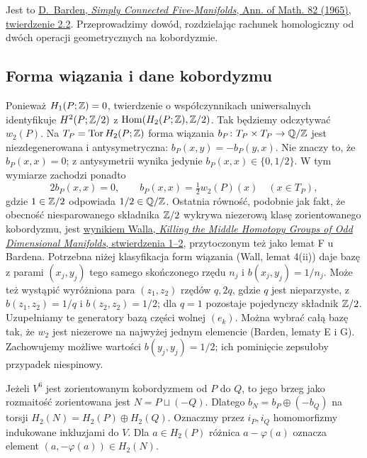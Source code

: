 Jest to
\href{https://www.sas.rochester.edu/mth/sites/doug-ravenel/otherpapers/barden.pdf}
{D.\ Barden, \emph{Simply Connected Five-Manifolds},
Ann. of Math. 82 (1965), twierdzenie 2.2}.
Przeprowadzimy dowód, rozdzielając
rachunek homologiczny od dwóch operacji
geometrycznych na kobordyzmie.

\subsection*{Forma wiązania i dane kobordyzmu}

Ponieważ $H_1(P;\mathbb{Z})=0$, twierdzenie o
współczynnikach uniwersalnych identyfikuje
$H^2(P;\mathbb{Z}/2)$ z
$\operatorname{Hom}(H_2(P;\mathbb{Z}),\mathbb{Z}/2)$.
Tak będziemy odczytywać $w_2(P)$.
Na $T_P=\operatorname{Tor}H_2(P;\mathbb{Z})$
forma wiązania
$b_P\colon T_P\times T_P\to\mathbb{Q}/\mathbb{Z}$
jest niezdegenerowana i antysymetryczna:
$b_P(x,y)=-b_P(y,x)$. Nie znaczy to,
że $b_P(x,x)=0$; z antysymetrii wynika
jedynie $b_P(x,x)\in\{0,1/2\}$.
W tym wymiarze zachodzi ponadto
\[
  2b_P(x,x)=0,\qquad
  b_P(x,x)=\tfrac12 w_2(P)(x)
  \quad(x\in T_P),
\]
gdzie $1\in\mathbb{Z}/2$ odpowiada $1/2\in\mathbb{Q}/\mathbb{Z}$.
Ostatnia równość, podobnie jak fakt,
że obecność niesparowanego składnika
$\mathbb{Z}/2$ wykrywa niezerową klasę
zorientowanego kobordyzmu, jest
\href{https://webhomes.maths.ed.ac.uk/~v1ranick/papers/kill.pdf}
{wynikiem Walla, \emph{Killing the Middle Homotopy Groups
of Odd Dimensional Manifolds}, stwierdzenia 1--2},
przytoczonym też jako lemat F u Bardena.
Potrzebna niżej klasyfikacja form wiązania
(Wall, lemat 4(ii)) daje bazę z parami
$(x_j,y_j)$ tego samego skończonego rzędu
$n_j$ i $b(x_j,y_j)=1/n_j$. Może też
wystąpić wyróżniona para $(z_1,z_2)$
rzędów $q,2q$, gdzie $q$ jest nieparzyste,
z $b(z_1,z_2)=1/q$ i $b(z_2,z_2)=1/2$;
dla $q=1$ pozostaje
pojedynczy składnik $\mathbb{Z}/2$. Uzupełniamy
te generatory bazą części wolnej $(e_k)$.
Można wybrać całą bazę tak, że $w_2$
jest niezerowe na najwyżej jednym elemencie
(Barden, lematy E i G). Zachowujemy
możliwe wartości $b(y_j,y_j)=1/2$;
ich pominięcie zepsułoby przypadek niespinowy.

Jeżeli $V^6$ jest zorientowanym kobordyzmem
od $P$ do $Q$, to jego brzeg jako
rozmaitość zorientowana jest
$N=P\sqcup(-Q)$. Dlatego
$b_N=b_P\oplus(-b_Q)$ na torsji
$H_2(N)=H_2(P)\oplus H_2(Q)$.
Oznaczmy przez $i_P,i_Q$ homomorfizmy
indukowane inkluzjami do $V$.
Dla $a\in H_2(P)$ różnica
$a-\varphi(a)$ oznacza element
$(a,-\varphi(a))\in H_2(N)$.

